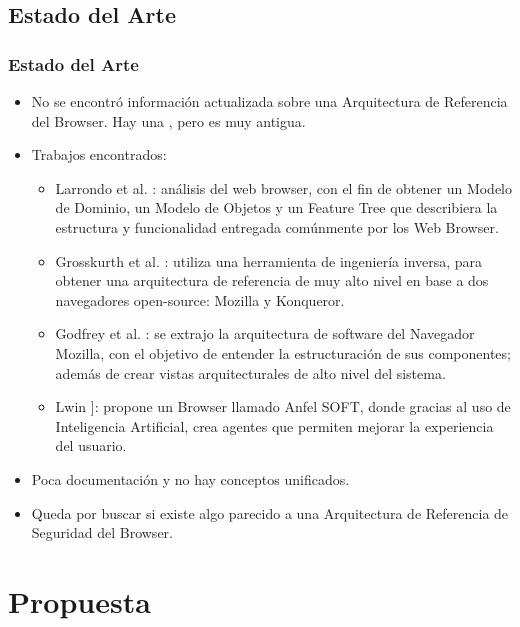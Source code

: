 \documentclass[serif,9pt]{beamer}
\begin{document}
\subsection{Estado del Arte}
\begin{frame}
	\frametitle{Estado del Arte}
	\begin{itemize}
		\item No se encontr\'o informaci\'on actualizada sobre una Arquitectura de Referencia del Browser. Hay una \cite{preprint-grosskurth-browser-archevol}, pero es muy antigua.
		\item Trabajos encontrados: 
		\begin{itemize}
			\item<1-> Larrondo et al. \cite{535061}: análisis del web browser, con el fin de obtener un Modelo de Dominio, un Modelo de Objetos y un Feature Tree que describiera la estructura y funcionalidad entregada comúnmente por los Web Browser.
			\item<2-> Grosskurth et al. \cite{2005-grosskurth-browser-refarch,preprint-grosskurth-browser-archevol}: utiliza una herramienta de ingeniería inversa, para obtener una arquitectura de referencia de muy alto nivel en base a dos navegadores open-source: Mozilla y Konqueror.
			\item<3-> Godfrey et al. \cite{Godfrey2000}: se extrajo la arquitectura de software del Navegador Mozilla, con el objetivo de entender la estructuración de sus componentes; además de crear vistas arquitecturales de alto nivel del sistema.
			\item<4-> Lwin \cite{Lwin2009}]: propone un Browser llamado Anfel SOFT, donde gracias al uso de Inteligencia Artificial, crea agentes que permiten mejorar la experiencia del usuario.
		\end{itemize}
		\item Poca documentaci\'on y no hay conceptos unificados.
		\item Queda por buscar si existe algo parecido a una Arquitectura de Referencia de Seguridad del Browser.
	\end{itemize}
\end{frame}


\section{Propuesta}
\end{document}
